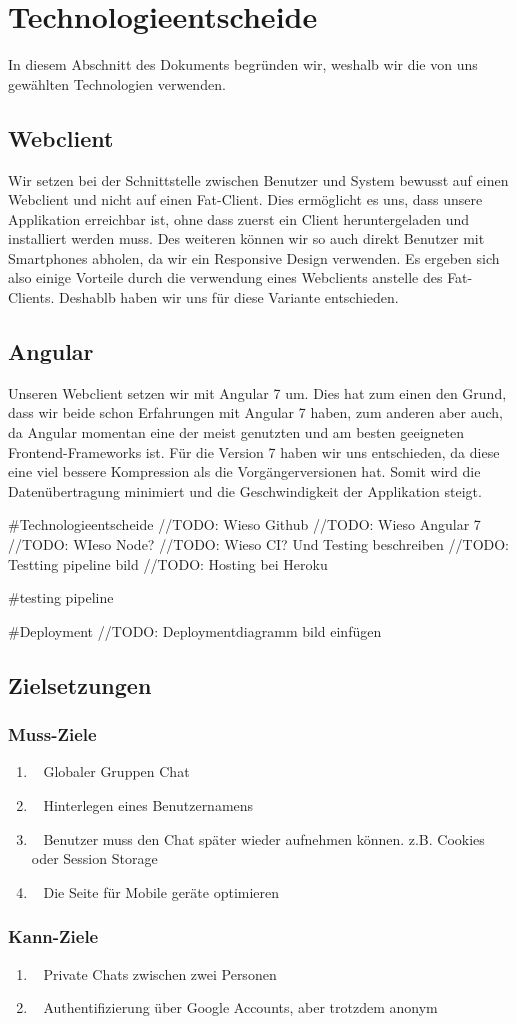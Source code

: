 	\section{Technologieentscheide}
	In diesem Abschnitt des Dokuments begründen wir, weshalb wir die von uns gewählten Technologien verwenden.

	\subsection{Webclient}
	Wir setzen bei der Schnittstelle zwischen Benutzer und System bewusst auf einen Webclient und nicht auf einen Fat-Client. Dies ermöglicht es uns, dass unsere Applikation erreichbar ist, ohne dass zuerst ein Client heruntergeladen und installiert werden muss. Des weiteren können wir so auch direkt Benutzer mit Smartphones abholen, da wir ein Responsive Design verwenden. Es ergeben sich also einige Vorteile durch die verwendung eines Webclients anstelle des Fat-Clients. Deshablb haben wir uns für diese Variante entschieden.

	\subsection{Angular}
	Unseren Webclient setzen wir mit Angular 7 um. Dies hat zum einen den Grund, dass wir beide schon Erfahrungen mit Angular 7 haben, zum anderen aber auch, da Angular momentan eine der meist genutzten und am besten geeigneten Frontend-Frameworks ist. Für die Version 7 haben wir uns entschieden, da diese eine viel bessere Kompression als die Vorgängerversionen hat. Somit wird die Datenübertragung minimiert und die Geschwindigkeit der Applikation steigt.

#Technologieentscheide
	//TODO: Wieso Github
	//TODO: Wieso Angular 7
	//TODO: WIeso Node?
	//TODO: Wieso CI? Und Testing beschreiben //TODO: Testting pipeline bild
	//TODO: Hosting bei Heroku

#testing pipeline

#Deployment
	//TODO: Deploymentdiagramm bild einfügen


	\subsection{Zielsetzungen}
	\subsubsection{Muss-Ziele}
	\begin{enumerate}
		\item \faGlobe~   Globaler Gruppen Chat
		\item \faUser~    Hinterlegen eines Benutzernamens
		\item \faKey~     Benutzer muss den Chat später wieder aufnehmen können. z.B. Cookies oder Session Storage
		\item \faMobile~  Die Seite für Mobile geräte optimieren
	\end{enumerate}

	\subsubsection{Kann-Ziele}
	\begin{enumerate}
		\item \faUsers~   Private Chats zwischen zwei Personen
		\item \faGoogle~  Authentifizierung über Google Accounts, aber trotzdem anonym
	\end{enumerate}

